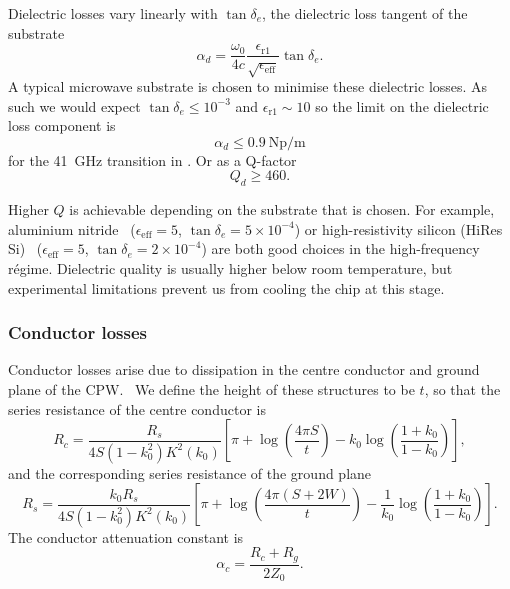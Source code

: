 Dielectric losses vary linearly with $\tan \delta_e$, the dielectric loss
tangent of the substrate~\cite{Collin2007}
\begin{equation}
  \alpha_d =
  \frac{\omega_0}{4c}\frac{\epsilon_\mathrm{r1}}{\sqrt{\epsilon_\mathrm{eff}}}
  \tan \delta_e.
\end{equation}
A typical microwave substrate is chosen to minimise these dielectric losses. As
such we would expect $\tan\delta_e\leq10^{-3}$ and
$\epsilon_\mathrm{r1} \sim 10$ so the limit on the dielectric loss component is
\begin{equation}
  \alpha_d \leq \SI{0.9}{\neper\per\meter}
\end{equation}
for the \SI{41}{\giga\hertz} transition in \CaF. Or as a Q-factor
\begin{equation}
  Q_d \geq 460.
\end{equation}

Higher $Q$ is achievable depending on the substrate that is chosen. For example,
aluminium nitride~\cite{mw101}  ($\epsilon_\mathrm{eff}=5$, $\tan\delta_e =
5\times10^{-4}$) or high-resistivity silicon (HiRes Si)~\cite{1717770}
($\epsilon_\mathrm{eff}=5$, $\tan\delta_e =2\times10^{-4}$) are both good
choices in the high-frequency r\'egime.  Dielectric quality is usually higher
below room temperature, but experimental limitations prevent us from cooling the
chip at this stage.

\subsubsection*{Conductor losses}

Conductor losses arise due to dissipation in the centre conductor and ground
plane of the CPW.~\cite{Simons2004} We define the height of these structures to
be $t$, so that the series resistance of the centre conductor is
\begin{equation}
  R_c = \frac{R_s}{4 S(1-k_0^2)K^2(k_0)}\left[ \pi + \log\left(\frac{4\pi
  S}{t}\right) - k_0\log\left(\frac{1+k_0}{1-k_0}\right) \right],
\end{equation}
and the corresponding series resistance of the ground plane
\begin{equation}
  R_s = \frac{k_0 R_s}{4S(1-k_0^2)K^2(k_0)}\left[\pi +
  \log\left(\frac{4\pi(S+2W)}{t}\right) -
  \frac{1}{k_0}\log\left(\frac{1+k_0}{1-k_0}\right)\right].
\end{equation}
The conductor attenuation constant is
\begin{equation}
  \alpha_c = \frac{R_c +R_g}{2Z_0}.
\end{equation}


